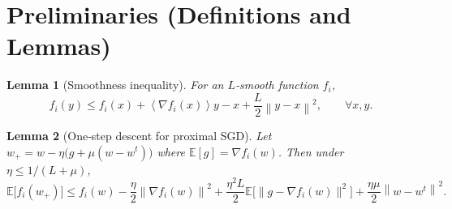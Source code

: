 \documentclass{article}
\newtheorem{lemma}{Lemma}
\newcommand{\E}{\mathbb{E}}
\newcommand{\norm}[1]{\left\lVert#1\right\rVert}
\newcommand{\inner}[1]{\left\langle#1\right\rangle}
\begin{document}
\newpage
\section*{Preliminaries (Definitions and Lemmas)}
\begin{lemma}[Smoothness inequality]\label{lem:smooth}
For an $L$‑smooth function $f_i$,
\[
f_i(y)\le f_i(x)+\inner{\nabla f_i(x)}{y-x}+\frac{L}{2}\norm{y-x}^{2},\qquad\forall x,y.
\]
\end{lemma}
\begin{lemma}[One‑step descent for proximal SGD]\label{lem:onestep}
Let $w_{+}=w-\eta\bigl(g+\mu(w-w^{t})\bigr)$ where $\E[g]=\nabla f_i(w)$.  
Then under $\eta\le 1/(L+\mu)$,
\[
\E\!\bigl[f_i(w_{+})\bigr]\le
f_i(w)-\frac{\eta}{2}\norm{\nabla f_i(w)}^{2}
+\frac{\eta^{2}L}{2}\E\!\bigl[\|g-\nabla f_i(w)\|^{2}\bigr]
+\frac{\eta\mu}{2}\norm{w-w^{t}}^{2}.
\tag{4}
\]
\end{lemma}
\end{document}
